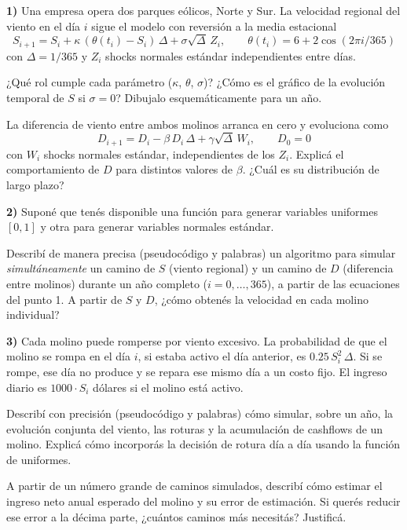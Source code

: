 \documentclass[11pt]{article}
\begin{document}

\noindent\textbf{1)} Una empresa opera dos parques eólicos, Norte y Sur. La velocidad regional del viento en el día $i$ sigue el modelo con reversión a la media estacional
\[
S_{i+1} = S_i + \kappa\,(\theta(t_i) - S_i)\,\Delta + \sigma\sqrt{\Delta}\,Z_i, \qquad \theta(t_i) = 6 + 2\cos(2\pi i / 365)
\]
con $\Delta = 1/365$ y $Z_i$ shocks normales estándar independientes entre días.

\medskip
{} ¿Qué rol cumple cada parámetro ($\kappa$, $\theta$, $\sigma$)? ¿Cómo es el gráfico de la evolución temporal de $S$ si $\sigma = 0$? Dibujalo esquemáticamente para un año.

\espacio{4.5cm}

 La diferencia de viento entre ambos molinos arranca en cero y evoluciona como
\[
D_{i+1} = D_i - \beta\,D_i\,\Delta + \gamma\sqrt{\Delta}\,W_i, \qquad D_0 = 0
\]
con $W_i$ shocks normales estándar, independientes de los $Z_i$. Explicá el comportamiento de $D$ para distintos valores de $\beta$. ¿Cuál es su distribución de largo plazo?

\espacio{4.5cm}

\noindent\textbf{2)} Suponé que tenés disponible una función para generar variables uniformes $[0,1]$ y otra para generar variables normales estándar.

\medskip
{} Describí de manera precisa (pseudocódigo y palabras) un algoritmo para simular \emph{simultáneamente} un camino de $S$ (viento regional) y un camino de $D$ (diferencia entre molinos) durante un año completo ($i = 0, \dots, 365$), a partir de las ecuaciones del punto 1. A partir de $S$ y $D$, ¿cómo obtenés la velocidad en cada molino individual?

\espacio{6.5cm}

\noindent\textbf{3)} Cada molino puede romperse por viento excesivo. La probabilidad de que el molino se rompa en el día $i$, si estaba activo el día anterior, es $0.25\, S_i^2\, \Delta$. Si se rompe, ese día no produce y se repara ese mismo día a un costo fijo. El ingreso diario es $1000 \cdot S_i$ dólares si el molino está activo.

\medskip
{} Describí con precisión (pseudocódigo y palabras) cómo simular, sobre un año, la evolución conjunta del viento, las roturas y la acumulación de cashflows de un molino. Explicá cómo incorporás la decisión de rotura día a día usando la función de uniformes.

\espacio{6.5cm}

 A partir de un número grande de caminos simulados, describí cómo estimar el ingreso neto anual esperado del molino y su error de estimación. Si querés reducir ese error a la décima parte, ¿cuántos caminos más necesitás? Justificá.

\espacio{4.5cm}
\end{document}
